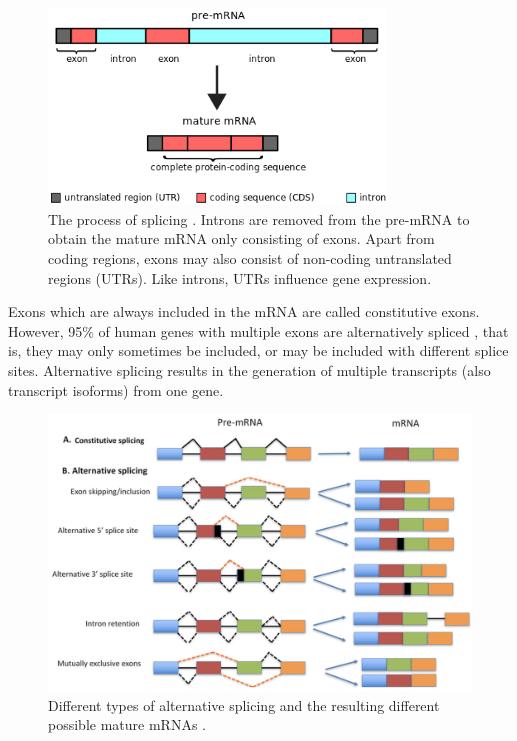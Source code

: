 \begin{figure}
	\centering\includegraphics[width=0.8\textwidth]{../visualizations/ch2-biobackground/pre-mrna2mrna.png} 
	\caption
	{The process of splicing \cite{img:mrna}. Introns are removed from the pre-mRNA to obtain the mature mRNA only consisting of exons. Apart from coding regions, exons may also consist of non-coding untranslated regions (UTRs). Like introns, UTRs influence gene expression. 
	}
	\label{fig:pre-mrna2mrna}
\end{figure}



Exons which are always included in the mRNA are called constitutive exons. However, 95\% of human genes with multiple exons are alternatively spliced \cite{barash2010a}, that is, they may only sometimes be included, or may be included with different splice sites. Alternative splicing results in the generation of multiple transcripts (also transcript isoforms) from one gene. 

\begin{figure}[h]
	\centering\includegraphics[width=1\textwidth]{../visualizations/ch2-biobackground/alternative_splicing_forms.png} 
	\caption
	{Different types of alternative splicing and the resulting different possible mature mRNAs \cite{img:altsplicingforms}.
	}
	\label{fig:altsplicingforms}
\end{figure}

